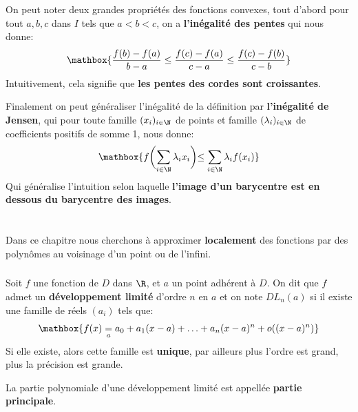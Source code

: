 \subsection*{}

On peut noter deux grandes propriétés des fonctions convexes, tout d'abord pour tout \(a, b, c\) dans \(I\) tels que \(a < b < c\), on a \textbf{l'inégalité des pentes} qui nous donne:
\[
   \mathbox{\frac{f(b)-f(a)}{b-a} \leq \frac{f(c)-f(a)}{c-a} \leq \frac{f(c)-f(b)}{c-b}}   
\]
Intuitivement, cela signifie que \textbf{les pentes des cordes sont croissantes}.\<

Finalement on peut généraliser l'inégalité de la définition par \textbf{l'inégalité de Jensen}, qui pour toute famille \((x_i)_{i \in \N}\) de points et famille \((\lambda_i)_{i \in \N}\) de coefficients positifs de somme 1, nous donne:
\[
   \mathbox{f\biggl(\sum_{i \in \N} \lambda_i x_i\biggl) \leq  \sum_{i \in \N} \lambda_i f(x_i)}
\]
Qui généralise l'intuition selon laquelle \textbf{l'image d'un barycentre est en dessous du barycentre des images}.

\chapter*{} %

Dans ce chapitre nous cherchons à approximer \textbf{localement} des fonctions par des polynômes au voisinage d'un point ou de l'infini.
\subsection*{}

Soit \(f\) une fonction de \(D\) dans \(\R\), et \(a\) un point adhérent à \(D\). On dit que \(f\) admet un \textbf{développement limité} d'ordre \(n\) en \(a\) et on note \(DL_n(a)\) si il existe une famille de réels \((a_i)\) tels que:
\[
   \mathbox{f(x) \underset{a}{=} a_0 + a_1(x-a) + \ldots + a_n(x-a)^n + o((x-a)^n)}   
\]
Si elle existe, alors cette famille est \textbf{unique}, par ailleurs plus l'ordre est grand, plus la précision est grande.\+

La partie polynomiale d'une développement limité est appellée \textbf{partie principale}.

\subsection*{}


